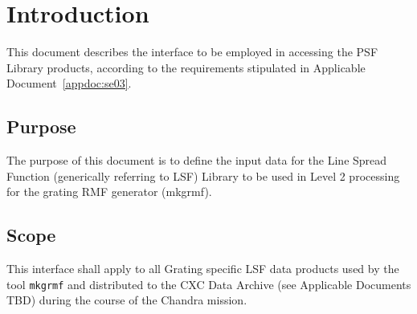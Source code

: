 \documentclass[twoside]{article}
\begin{document}
\section{Introduction}

This document describes the interface to be employed in accessing 
the PSF Library products, according to the requirements stipulated in 
Applicable Document~\ref{appdoc:se03}.%
%

\subsection{Purpose}

The purpose of this document is to define the input data for the Line
Spread Function (generically referring to LSF) Library to be used in
Level 2 processing for the grating RMF generator (mkgrmf).
%

\subsection{Scope}

This interface shall apply to all Grating specific LSF
data products used by the tool {\tt mkgrmf}
and distributed to the CXC Data
Archive (see Applicable Documents TBD) during the course of
the Chandra mission.
\end{document}
